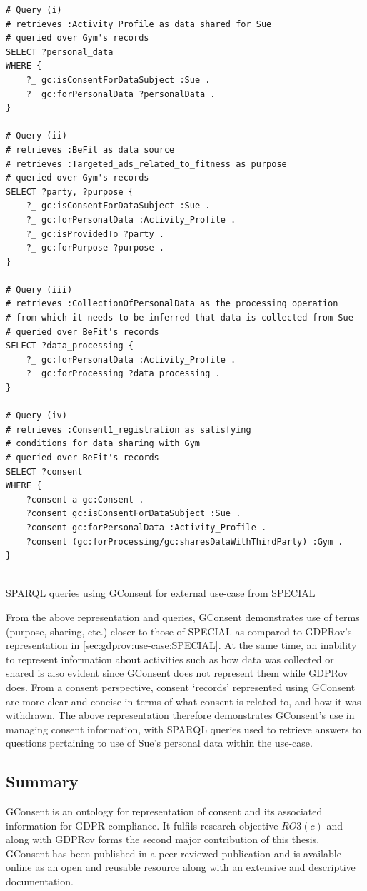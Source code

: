 \begin{listing}[htbp]
\begin{verbatim}
# Query (i)
# retrieves :Activity_Profile as data shared for Sue
# queried over Gym's records
SELECT ?personal_data
WHERE {
	?_ gc:isConsentForDataSubject :Sue .
	?_ gc:forPersonalData ?personalData .
}

# Query (ii)
# retrieves :BeFit as data source
# retrieves :Targeted_ads_related_to_fitness as purpose
# queried over Gym's records
SELECT ?party, ?purpose {
	?_ gc:isConsentForDataSubject :Sue .
	?_ gc:forPersonalData :Activity_Profile .
	?_ gc:isProvidedTo ?party .
	?_ gc:forPurpose ?purpose .
}

# Query (iii)
# retrieves :CollectionOfPersonalData as the processing operation
# from which it needs to be inferred that data is collected from Sue
# queried over BeFit's records
SELECT ?data_processing {
    ?_ gc:forPersonalData :Activity_Profile .
    ?_ gc:forProcessing ?data_processing .
}

# Query (iv)
# retrieves :Consent1_registration as satisfying
# conditions for data sharing with Gym
# queried over BeFit's records
SELECT ?consent
WHERE {
	?consent a gc:Consent .
	?consent gc:isConsentForDataSubject :Sue .
	?consent gc:forPersonalData :Activity_Profile .
	?consent (gc:forProcessing/gc:sharesDataWithThirdParty) :Gym .
}


\end{verbatim}
\caption{SPARQL queries using GConsent for external use-case from SPECIAL}
\label{code:gconsent:use-case:special-sparql}
\end{listing}

From the above representation and queries, GConsent demonstrates use of terms (purpose, sharing, etc.) closer to those of SPECIAL as compared to GDPRov's representation in \autoref{sec:gdprov:use-case:SPECIAL}.
At the same time, an inability to represent information about activities such as how data was collected or shared is also evident since GConsent does not represent them while GDPRov does.
From a consent perspective, consent `records' represented using GConsent are more clear and concise in terms of what consent is related to, and how it was withdrawn.
The above representation therefore demonstrates GConsent's use in managing consent information, with SPARQL queries used to retrieve answers to questions pertaining to use of Sue's personal data within the use-case.

\subsection*{Summary}
GConsent is an ontology for representation of consent and its associated information for GDPR compliance. It fulfils research objective $RO3(c)$ and along with GDPRov forms the second major contribution of this thesis.
GConsent has been published in a peer-reviewed publication and is available online as an open and reusable resource along with an extensive and descriptive documentation.

